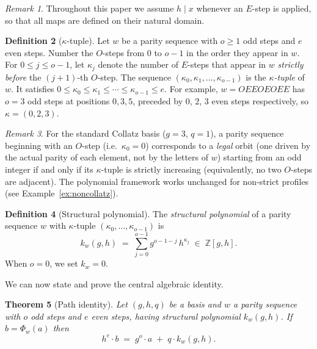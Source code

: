 \documentclass[12pt]{article}
\newtheorem{theorem}{Theorem}[section]
\theoremstyle{definition}
\newtheorem{definition}[theorem]{Definition}
\theoremstyle{remark}
\newtheorem{remark}[theorem]{Remark}
\newcommand{\ZZ}{\mathbb{Z}}
\newcommand{\kpoly}{k}
\begin{document}
\begin{remark}
Throughout this paper we assume $h \mid x$ whenever an $E$-step is applied,
so that all maps are defined on their natural domain.
\end{remark}

\begin{definition}[$\kappa$-tuple]
\label{def:eprofile}
Let $w$ be a parity sequence with $o \geq 1$ odd steps and $e$ even steps.
Number the $O$-steps from $0$ to $o-1$ in the order they appear in $w$.
For $0 \leq j \leq o-1$, let $\kappa_j$ denote the number of $E$-steps that
appear in $w$ \emph{strictly before} the $(j+1)$-th $O$-step.  The sequence
$(\kappa_0, \kappa_1, \ldots, \kappa_{o-1})$ is the \emph{$\kappa$-tuple}
of $w$.  It satisfies $0 \leq \kappa_0 \leq \kappa_1 \leq \cdots \leq \kappa_{o-1} \leq e$.
For example, $w = OEEOEOEE$ has $o = 3$ odd steps at positions $0, 3, 5$,
preceded by $0$, $2$, $3$ even steps respectively, so $\kappa = (0, 2, 3)$.
\end{definition}

\begin{remark}
For the standard Collatz basis ($g=3$, $q=1$), a parity sequence beginning
with an $O$-step (i.e.\ $\kappa_0 = 0$) corresponds to a \emph{legal} orbit
(one driven by the actual parity of each element, not by the letters of $w$)
starting from an odd integer if and only if its $\kappa$-tuple is strictly
increasing
(equivalently, no two $O$-steps are adjacent).  The polynomial framework works
unchanged for non-strict profiles (see Example~\ref{ex:noncollatz}).
\end{remark}

\begin{definition}[Structural polynomial]
\label{def:structpoly}
The \emph{structural polynomial} of a parity sequence $w$ with
$\kappa$-tuple $(\kappa_0, \ldots, \kappa_{o-1})$ is
\[
  \kpoly_w(g,h) \;=\; \sum_{j=0}^{o-1} g^{o-1-j}\, h^{\kappa_j}
  \;\in\; \ZZ[g,h].
\]
When $o = 0$, we set $\kpoly_w = 0$.
\end{definition}

We can now state and prove the central algebraic identity.

\begin{theorem}[Path identity]
\label{thm:path}
Let $(g,h,q)$ be a basis and $w$ a parity sequence with $o$ odd steps and
$e$ even steps, having structural polynomial $\kpoly_w(g,h)$.  If
$b = \Phi_w(a)$ then
\begin{equation}
  \label{eq:path}
  h^e \cdot b \;=\; g^o \cdot a \;+\; q \cdot \kpoly_w(g,h).
\end{equation}
\end{theorem}
\end{document}
